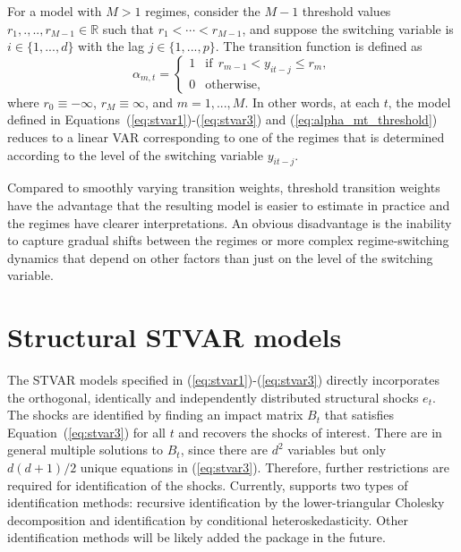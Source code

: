 \documentclass[nojss]{jss}
\begin{document}
For a model with $M>1$ regimes, consider the $M-1$ threshold values $r_1,.,..,r_{M - 1}\in\mathbb{R}$ such that $r_1<\cdots<r_{M-1}$, and suppose the switching variable is $i\in \lbrace 1,...,d \rbrace$ with the lag $j\in \lbrace 1,...,p \rbrace$. The transition function is defined as
\begin{equation}\label{eq:alpha_mt_threshold}
\alpha_{m,t} =
\left\lbrace\begin{matrix}
1 & \text{if} \ \ r_{m-1} < y_{it-j} \leq r_{m}, \\
0 & \text{otherwise}, \phantom{aaaaaaaaa}
\end{matrix}\right.
\end{equation}
where $r_0\equiv-\infty$, $r_M\equiv\infty$, and $m=1,...,M$. In other words, at each $t$‚ the model defined in Equations~(\ref{eq:stvar1})-(\ref{eq:stvar3}) and (\ref{eq:alpha_mt_threshold}) reduces to a linear VAR corresponding to one of the regimes that is determined according to the level of the switching variable $y_{it-j}$.

Compared to smoothly varying transition weights, threshold transition weights have the advantage that the resulting model is easier to estimate in practice and the regimes have clearer interpretations. An obvious disadvantage is the inability to capture gradual shifts between the regimes or more complex regime-switching dynamics that depend on other factors than just on the level of the switching variable.

\section{Structural STVAR models}\label{sec:struct_stvar}
The STVAR models specified in (\ref{eq:stvar1})-(\ref{eq:stvar3}) directly incorporates the orthogonal, identically and independently distributed structural shocks $e_t$. The shocks are identified by finding an impact matrix $B_t$ that satisfies Equation~(\ref{eq:stvar3}) for all $t$ and recovers the shocks of interest. There are in general multiple solutions to $B_t$, since there are $d^2$ variables but only $d(d+1)/2$ unique equations in (\ref{eq:stvar3}). Therefore, further restrictions are required for identification of the shocks. Currently,  supports two types of identification methods: recursive identification by the lower-triangular Cholesky decomposition and identification by conditional heteroskedasticity. Other identification methods will be likely added the package in the future.
\end{document}
